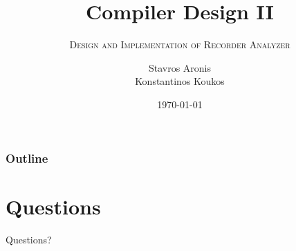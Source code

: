 \documentclass{beamer}
\title{Compiler Design II}
\subtitle{\textsc{Design and Implementation of Recorder Analyzer}}
\author[Aronis \& Koukos]{Stavros Aronis \\ Konstantinos Koukos}
\institute[Uppsala University]
{
\textsc{\Large Uppsala University}\\[0.1cm]
\textsc{\Large Department of Information Technology}\\[2.0cm]
\vfill
}
\date{\today}
\begin{document}
\begin{frame}
\titlepage
\end{frame}

\begin{frame}
\frametitle{Outline}
\tableofcontents[hideallsubsections]
\end{frame}









\section*{Questions}
\begin{frame}
\begin{block}{}
\begin{center}
\Huge Questions?
\end{center}
\end{block}
\end{frame}
\end{document}
